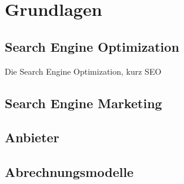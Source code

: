 %
\chapter{Grundlagen}
\label{sec:Grundlagen}


\section{Search Engine Optimization}
\label{sec:intro:SEO}

Die Search Engine Optimization, kurz SEO

\section{Search Engine Marketing}
\label{sec:intro:SEM}

\section{Anbieter}
\label{sec:intro:Anbieter}

\section{Abrechnungsmodelle}
\label{sec:intro:Abrechnungsmodelle}
